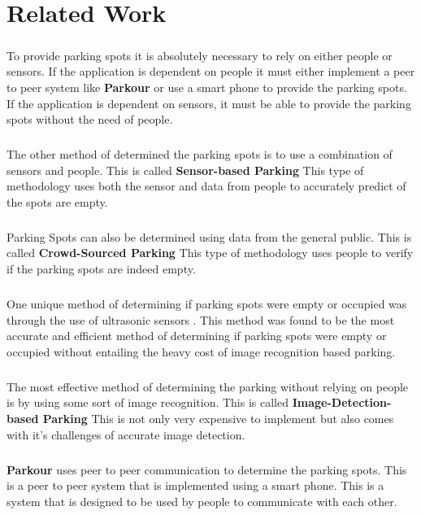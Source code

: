 \chapter{Related Work}
    
    \paragraph*{}
    To provide parking spots it is absolutely necessary to rely on either people or sensors. If the application is dependent on people it must either implement a peer to peer system like \textbf{Parkour} or use a smart phone to provide the parking spots. If the application is dependent on sensors, it must be able to provide the parking spots
    without the need of people.

    \paragraph*{}
    The other method of determined the parking spots is to use a combination of sensors and people. This is called \textbf{Sensor-based Parking} \cite{cai2015implementation} This type of methodology uses both the sensor and data from people to accurately predict of the spots are empty.

    
    \paragraph*{}
    Parking Spots can also be determined using data from the general public. This is called \textbf{Crowd-Sourced Parking} \cite{mitsopoulou2017efficient} This type of methodology uses people to verify if the parking spots are indeed empty.
    
    
    
    \paragraph*{}
    One unique method of determining if parking spots were empty or occupied was through the use of ultrasonic sensors \cite{park2008parking}. This method was found to be the most accurate and efficient method of determining if parking spots were empty or occupied without entailing the heavy cost of image recognition based parking. 
    

    \paragraph*{}
    The most effective method of determining the parking without relying on people is by using some sort of image recognition. This is called \textbf{Image-Detection-based Parking} \cite{yusnita2012intelligent} This is not only very expensive to implement but also comes with it's challenges of accurate image detection.
    
    \paragraph*{}
    \textbf{Parkour} uses peer to peer communication to determine the parking spots. This is a peer to peer system that is implemented using a smart phone. This is a system that is designed to be used by people to communicate with each other.
    


